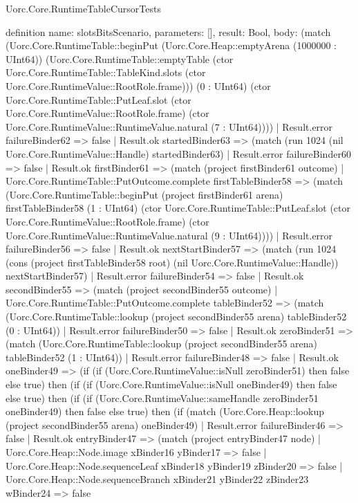 \begin{lexlean}{Uorc.Core.RuntimeTableCursorTests}
\begin{semanticmodule}
definition{
  name: slotsBitsScenario,
  parameters: [],
  result: Bool,
  body: (match (Uorc.Core.RuntimeTable::beginPut (Uorc.Core.Heap::emptyArena (1000000 : UInt64)) (Uorc.Core.RuntimeTable::emptyTable (ctor Uorc.Core.RuntimeTable::TableKind.slots (ctor Uorc.Core.RuntimeValue::RootRole.frame))) (0 : UInt64) (ctor Uorc.Core.RuntimeTable::PutLeaf.slot (ctor Uorc.Core.RuntimeValue::RootRole.frame) (ctor Uorc.Core.RuntimeValue::RuntimeValue.natural (7 : UInt64))))
    | Result.error failureBinder62 => false
    | Result.ok startedBinder63 => (match (run 1024 (nil Uorc.Core.RuntimeValue::Handle) startedBinder63)
      | Result.error failureBinder60 => false
      | Result.ok firstBinder61 => (match (project firstBinder61 outcome)
        | Uorc.Core.RuntimeTable::PutOutcome.complete firstTableBinder58 => (match (Uorc.Core.RuntimeTable::beginPut (project firstBinder61 arena) firstTableBinder58 (1 : UInt64) (ctor Uorc.Core.RuntimeTable::PutLeaf.slot (ctor Uorc.Core.RuntimeValue::RootRole.frame) (ctor Uorc.Core.RuntimeValue::RuntimeValue.natural (9 : UInt64))))
          | Result.error failureBinder56 => false
          | Result.ok nextStartBinder57 => (match (run 1024 (cons (project firstTableBinder58 root) (nil Uorc.Core.RuntimeValue::Handle)) nextStartBinder57)
            | Result.error failureBinder54 => false
            | Result.ok secondBinder55 => (match (project secondBinder55 outcome)
              | Uorc.Core.RuntimeTable::PutOutcome.complete tableBinder52 => (match (Uorc.Core.RuntimeTable::lookup (project secondBinder55 arena) tableBinder52 (0 : UInt64))
                | Result.error failureBinder50 => false
                | Result.ok zeroBinder51 => (match (Uorc.Core.RuntimeTable::lookup (project secondBinder55 arena) tableBinder52 (1 : UInt64))
                  | Result.error failureBinder48 => false
                  | Result.ok oneBinder49 => (if (if (Uorc.Core.RuntimeValue::isNull zeroBinder51) then false else true) then (if (if (Uorc.Core.RuntimeValue::isNull oneBinder49) then false else true) then (if (if (Uorc.Core.RuntimeValue::sameHandle zeroBinder51 oneBinder49) then false else true) then (if (match (Uorc.Core.Heap::lookup (project secondBinder55 arena) oneBinder49)
                    | Result.error failureBinder46 => false
                    | Result.ok entryBinder47 => (match (project entryBinder47 node)
                      | Uorc.Core.Heap::Node.image xBinder16 yBinder17 => false
                      | Uorc.Core.Heap::Node.sequenceLeaf xBinder18 yBinder19 zBinder20 => false
                      | Uorc.Core.Heap::Node.sequenceBranch xBinder21 yBinder22 zBinder23 wBinder24 => false
}
\end{semanticmodule}
\end{lexlean}
